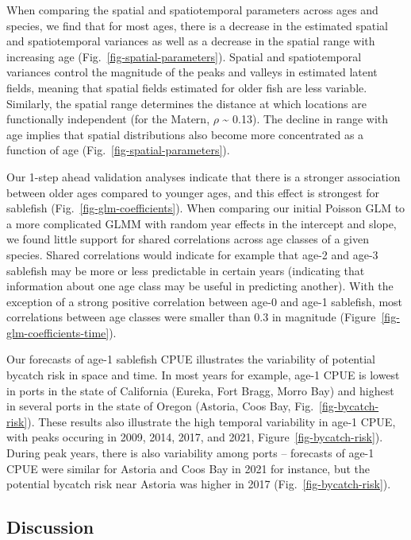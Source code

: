 \documentclass[
]{article}
\begin{document}
When comparing the spatial and spatiotemporal parameters across ages and
species, we find that for most ages, there is a decrease in the
estimated spatial and spatiotemporal variances as well as a decrease in
the spatial range with increasing age
(Fig.~\ref{fig-spatial-parameters}). Spatial and spatiotemporal
variances control the magnitude of the peaks and valleys in estimated
latent fields, meaning that spatial fields estimated for older fish are
less variable. Similarly, the spatial range determines the distance at
which locations are functionally independent (for the Matern, \(\rho\)
\textasciitilde{} 0.13). The decline in range with age implies that
spatial distributions also become more concentrated as a function of age
(Fig.~\ref{fig-spatial-parameters}).

Our 1-step ahead validation analyses indicate that there is a stronger
association between older ages compared to younger ages, and this effect
is strongest for sablefish (Fig.~\ref{fig-glm-coefficients}). When
comparing our initial Poisson GLM to a more complicated GLMM with random
year effects in the intercept and slope, we found little support for
shared correlations across age classes of a given species. Shared
correlations would indicate for example that age-2 and age-3 sablefish
may be more or less predictable in certain years (indicating that
information about one age class may be useful in predicting another).
With the exception of a strong positive correlation between age-0 and
age-1 sablefish, most correlations between age classes were smaller than
0.3 in magnitude (Figure~\ref{fig-glm-coefficients-time}).

Our forecasts of age-1 sablefish CPUE illustrates the variability of
potential bycatch risk in space and time. In most years for example,
age-1 CPUE is lowest in ports in the state of California (Eureka, Fort
Bragg, Morro Bay) and highest in several ports in the state of Oregon
(Astoria, Coos Bay, Fig.~\ref{fig-bycatch-risk}). These results also
illustrate the high temporal variability in age-1 CPUE, with peaks
occuring in 2009, 2014, 2017, and 2021, Figure~\ref{fig-bycatch-risk}).
During peak years, there is also variability among ports -- forecasts of
age-1 CPUE were similar for Astoria and Coos Bay in 2021 for instance,
but the potential bycatch risk near Astoria was higher in 2017
(Fig.~\ref{fig-bycatch-risk}).

\hypertarget{discussion}{%
\subsection{Discussion}\label{discussion}}
\end{document}
